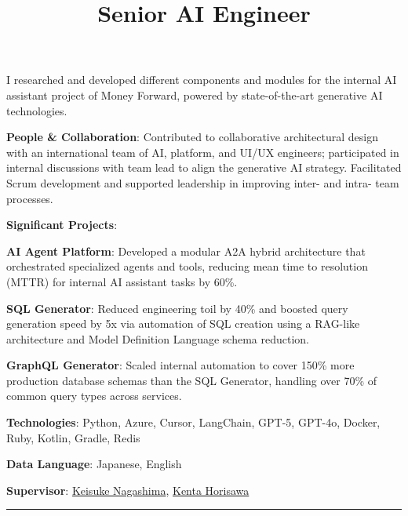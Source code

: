 \documentclass[margin]{res}
\makeatletter
\newcommand{\anchortarget}[1]{\Hy@raisedlink{\hyper@anchorstart{#1}\hyper@anchorend}}
\newcommand{\SubItem}[1]{
    {\setlength\itemindent{15pt} \item[-] #1}
}
\makeatother
\begin{document}
\begin{resume}
\employer{} %
\location{} %
\title{\textbf{Senior AI Engineer}\anchortarget{seniorAI}}
\begin{position}
I researched and developed different components and modules for the internal AI assistant project of Money Forward, powered by state-of-the-art generative AI technologies.\\
\vspace{-3mm}
\begin{itemize}
    \item \textbf{People \& Collaboration}: Contributed to collaborative architectural design with an international team of AI, platform, and UI/UX engineers; participated in internal discussions with team lead to align the generative AI strategy. Facilitated Scrum development and supported leadership in improving inter- and intra- team processes.
    \item \textbf{Significant Projects}:
    \SubItem{\textbf{AI Agent Platform}: Developed a modular A2A hybrid architecture that orchestrated specialized agents and tools, reducing mean time to resolution (MTTR) for internal AI assistant tasks by 60\%.}
    \SubItem{\textbf{SQL Generator}: Reduced engineering toil by 40\% and boosted query generation speed by 5x via automation of SQL creation using a RAG-like architecture and Model Definition Language schema reduction.}
    \SubItem{\textbf{GraphQL Generator}: Scaled internal automation to cover 150\% more production database schemas than the SQL Generator, handling over 70\% of common query types across services.}
    \item \textbf{Technologies}: Python, Azure, Cursor, LangChain, GPT-5, GPT-4o, Docker, Ruby, Kotlin, Gradle, Redis
    \item \textbf{Data Language}: Japanese, English
    \item \textbf{Supervisor}: \href{https://linkedin.com/in/keisuke-nagashima-704338b5}{Keisuke Nagashima}, \href{https://www.linkedin.com/in/%E5%81%A5%E5%A4%AA-%E5%A0%80%E6%BE%A4-5934491b8/}{Kenta Horisawa}
\end{itemize}
\end{position}

\vspace{1mm}
\hrule
\vspace{1mm}


\end{resume}
\end{document}
